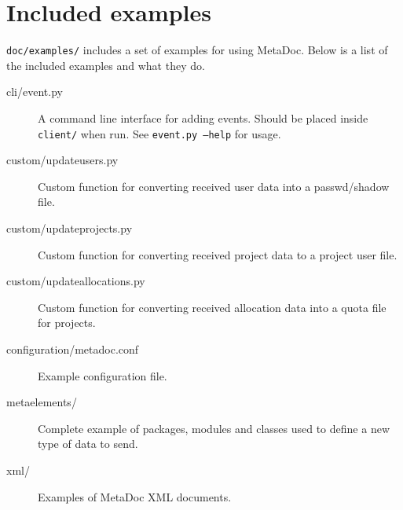 \newpage
\section{Included examples}
\texttt{doc/examples/} includes a set of examples for using MetaDoc. Below is a
list of the included examples and what they do. 

\begin{description}
    \item[cli/event.py] A command line interface for adding events. Should be
    placed inside \texttt{client/} when run. See \texttt{event.py --help} for
    usage.
    \item[custom/updateusers.py]    Custom function for converting received
    user data into a passwd/shadow file.
    \item[custom/updateprojects.py] Custom function for converting received
    project data to a project user file.
    \item[custom/updateallocations.py]  Custom function for converting received
    allocation data into a quota file for projects.
    \item[configuration/metadoc.conf]   Example configuration file.
    \item[metaelements/]    Complete example of packages, modules and classes
    used to define a new type of data to send.
    \item[xml/] Examples of MetaDoc XML documents.
\end{description}
